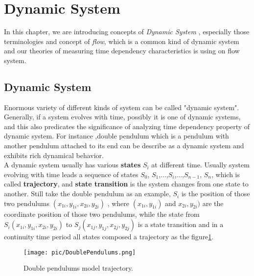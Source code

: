 \documentclass[
     11pt,         %
     a4paper,      %
     oneside,
     ]{article}
\begin{document}
	\section{Dynamic System}
	In this chapter, we are introducing concepts of \textit{Dynamic System }, especially those terminologies and concept of \textit{flow}, which is a common kind of dynamic system and our theories of measuring time dependency characteristics is using on flow system. \\
	\subsection{Dynamic System}
	Enormous variety of different kinds of system can be called "dynamic system". Generally, if a system evolves with time, possibly it is one of dynamic systems, and this also predicates the significance of analyzing time dependency property of dynamic system. For instance ,double pendulum which is a pendulum with another pendulum attached to its end can be describe as a dynamic system and exhibits rich dynamical behavior. \\
	
	A dynamic system usually has various \textbf{states} $S_{i}$ at different time. Usually system evolving with time leads a sequence of states $S_{0}$, $S_{1}$,...,$S_{i}$,...,$S_{n-1}$, $S_{n}$, which is called \textbf{trajectory}, and \textbf{state transition} is the system changes from one state to another. Still take the double pendulum as an example, $S_{i}$ is the position of those two pendulums $(x_{1i},y_{1i},x_{2i},y_{2i})$ , where $(x_{1i},y_{1i})$ and $x_{2i},y_{2i})$ are the coordinate position of those two pendulums, while the state from $S_{i}(x_{1i},y_{1i},x_{2i},y_{2i})$ to $S_{j}(x_{1j},y_{1j},x_{2j},y_{2j})$ is a state transition and in a continuity time period all states composed a trajectory as the figure\ref{fig:DoublePendulums}.\\
	\begin{figure}[H]
		\centering
		\texttt{[image: pic/DoublePendulums.png]}
		\caption{\tiny Double pendulums model trajectory.\cite{DoublePendulum} }
		\label{fig:DoublePendulums}
	\end{figure}
	
\end{document}
